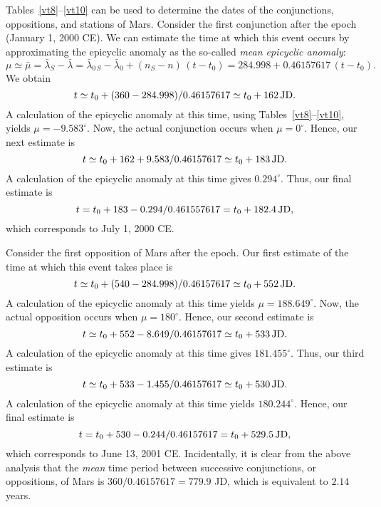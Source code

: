Tables~\ref{vt8}--\ref{vt10} can be used to determine the dates of the conjunctions, oppositions, and
stations of Mars. Consider the first conjunction after the epoch (January 1, 2000 CE). We can estimate the
time at which this event occurs by approximating the epicyclic anomaly as the so-called
{\em mean epicyclic anomaly}: 
$$
\mu \simeq \bar{\mu} = \bar{\lambda}_S-\bar{\lambda} = \bar{\lambda}_{0\,S}-\bar{\lambda}_0 +(n_S-n)\,(t-t_0) = 284.998 + 0.46157617\,(t-t_0).
$$
 We obtain
$$
t\simeq t_0 + (360-284.998)/0.46157617\simeq t_0 + 162\, {\rm JD}.
$$ 
A calculation of the epicyclic anomaly at this time, using Tables~\ref{vt8}--\ref{vt10}, yields $\mu=-9.583^\circ$. Now, the
actual conjunction occurs when $\mu=0^\circ$. Hence, our next estimate is 
$$
t\simeq t_0+162+9.583/0.46157617\simeq t_0 + 183\,{\rm JD}.
$$
A
calculation of the epicyclic anomaly at this time gives $0.294^\circ$. Thus, our final estimate is
$$
t=t_0 +183-0.294/0.461557617=t_0+182.4\, {\rm JD},
$$
which corresponds to July 1, 2000 CE.

Consider the first opposition of Mars after the epoch. Our first estimate of the time at which this
event takes place is 
$$
t\simeq t_0+(540-284.998)/0.46157617\simeq t_0 + 552\, {\rm JD}.
$$
A calculation of
the epicyclic anomaly at this time yields $\mu=188.649^\circ$. Now, the actual
opposition occurs when $\mu=180^\circ$. 
Hence, our second estimate is
$$
t\simeq t_0 +552-8.649/0.46157617\simeq t_0+533\,{\rm JD}.
$$
A calculation of the epicyclic anomaly
at this time  gives $181.455^\circ$. Thus, our third estimate is 
$$
t\simeq t_0+533-1.455/0.46157617 \simeq t_0+ 530\,{\rm JD}.
$$ A calculation of the epicyclic anomaly at this time yields $180.244^\circ$.
Hence, our final estimate is 
$$
t=t_0+530-0.244/0.46157617=t_0+529.5\,{\rm JD},
$$ 
which corresponds to
June 13, 2001 CE. Incidentally, it is clear from the above analysis that the
{\em mean}\/ time period between successive conjunctions,  or  oppositions, of Mars is $360/0.46157617= 779.9$ JD, which is
equivalent to $2.14$ years.

